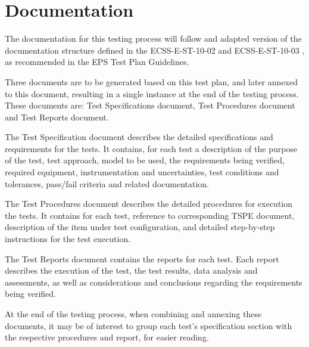 %
%
%
%
%

%
%
%
%
%

\chapter{Documentation} \label{ch:documentation}

The documentation for this testing process will follow and adapted version of the documentation structure defined in the ECSS-E-ST-10-02 \cite{ecss-e-st-10-02} and ECSS-E-ST-10-03 \cite{ecss-e-st-10-03}, as recommended in the EPS Test Plan Guidelines.

Three documents are to be generated based on this test plan, and later annexed to this document, resulting in a single instance at the end of the testing process.
These documents are: Test Specifications document, Test Procedures document and Test Reports document.

The Test Specification document describes the detailed specifications and requirements for the tests.
It contains, for each test a description of the purpose of the test, test approach, model to be used, the requirements being verified, required equipment, instrumentation and uncertainties, test conditions and tolerances, pass/fail criteria and related documentation.

The Test Procedures document describes the detailed procedures for execution the tests.
It contains for each test, reference to corresponding TSPE document, description of the item under test configuration,  and detailed step-by-step instructions for the test execution.

The Test Reports document contains the reports for each test. Each report describes the execution of the test, the test results, data analysis and assessments, as well as considerations and conclusions regarding the requirements being verified.

At the end of the testing process, when combining and annexing these documents, it may be of interest to group each test's specification section with the respective procedures and report, for easier reading.